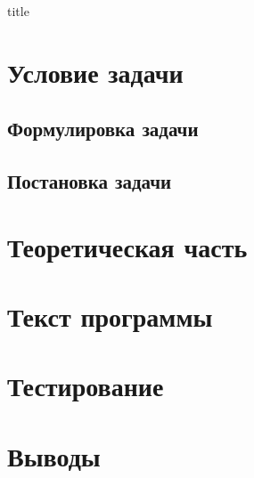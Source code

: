 \documentclass[12pt,a4paper]{article}
\begin{document}
    {title}


    \section{Условие задачи}


    \subsection*{Формулировка задачи}


    \subsection*{Постановка задачи}


    \section{Теоретическая часть}


    \section{Текст программы}


    \section{Тестирование}


    \section{Выводы}
\end{document}
